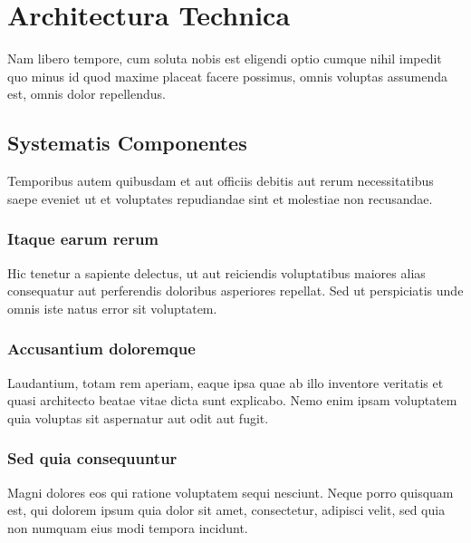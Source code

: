 \chapter{Architectura Technica}

Nam libero tempore, cum soluta nobis est eligendi optio cumque nihil impedit quo minus id quod maxime placeat facere possimus, omnis voluptas assumenda est, omnis dolor repellendus.

\section{Systematis Componentes}

Temporibus autem quibusdam et aut officiis debitis aut rerum necessitatibus saepe eveniet ut et voluptates repudiandae sint et molestiae non recusandae.

\subsection{Itaque earum rerum}
Hic tenetur a sapiente delectus, ut aut reiciendis voluptatibus maiores alias consequatur aut perferendis doloribus asperiores repellat. Sed ut perspiciatis unde omnis iste natus error sit voluptatem.

\subsection{Accusantium doloremque}
Laudantium, totam rem aperiam, eaque ipsa quae ab illo inventore veritatis et quasi architecto beatae vitae dicta sunt explicabo. Nemo enim ipsam voluptatem quia voluptas sit aspernatur aut odit aut fugit.

\subsection{Sed quia consequuntur}
Magni dolores eos qui ratione voluptatem sequi nesciunt. Neque porro quisquam est, qui dolorem ipsum quia dolor sit amet, consectetur, adipisci velit, sed quia non numquam eius modi tempora incidunt.